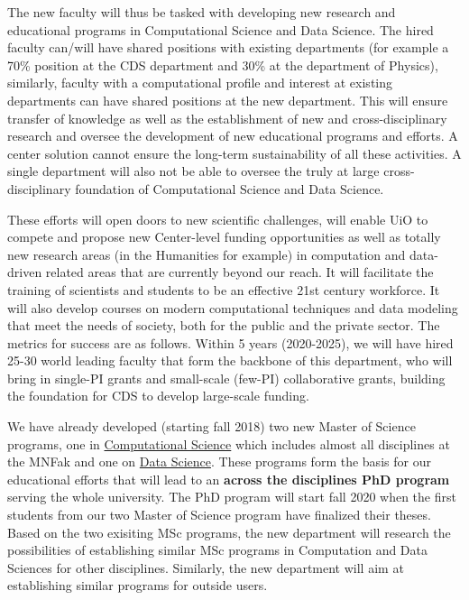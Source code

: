 \documentclass[%
oneside,                 %
final,                   %
10pt]{article}
\begin{document}
\noindent
The new faculty will thus be tasked with developing new research and educational programs in Computational Science and Data Science. The hired faculty can/will have shared positions with existing departments (for example a 70\% position at the CDS department and 30\% at the department of Physics), similarly, faculty with a computational profile and interest at existing departments can have shared positions at the new department. This will ensure transfer of knowledge as well as the establishment of new and cross-disciplinary research and  oversee the development of new educational programs and efforts. 
A center solution cannot ensure the long-term sustainability of all these activities. A single department will also not be able to oversee the truly at large cross-disciplinary foundation of Computational Science and Data Science. 


These efforts will open doors to new scientific challenges,
will enable UiO to compete and propose new Center-level funding
opportunities as well as totally new research areas (in the Humanities for example) in computation and data-driven related 
areas that are currently beyond
our reach. It will facilitate the training of scientists and students to be an effective 21st century workforce.  It will also develop courses on modern computational techniques and data modeling that meet the needs of society, both for the public and the private sector. The metrics for
success are as follows. Within 5 years (2020-2025), we will have hired 25-30
world leading faculty that form the backbone of this
department, who will bring in single-PI grants and small-scale
(few-PI) collaborative grants, building the foundation for CDS to
develop large-scale funding. 

We have already developed (starting fall 2018) two new Master of
Science programs, one in \href{{http://www.uio.no/english/studies/programmes/computational-science-master/index.html}}{Computational Science} which includes almost all
disciplines at the MNFak and one on \href{{http://www.uio.no/english/studies/programmes/datascience-master/index.html}}{Data Science}.  These
programs form the basis for our educational efforts that will lead to
an \textbf{across the disciplines PhD program} serving the whole
university. The PhD program will start fall 2020 when the first
students from our two Master of Science program have finalized their
theses.  Based on the two exisiting MSc programs, the new department will research the possibilities of establishing similar MSc programs in Computation and Data Sciences for other disciplines.  Similarly, the new department will aim at establishing similar programs for outside users.  
\end{document}
